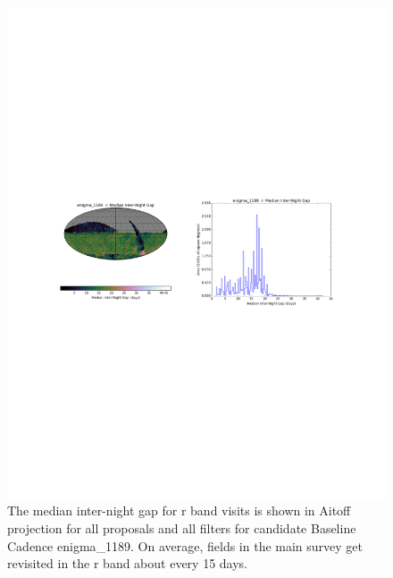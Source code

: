 \documentclass[manuscript]{article}
\begin{document}
\begin{figure}[h!]
\vskip -3.8in
\hskip -0.5in
\includegraphics[angle=0,width=1.19\hsize,clip]{enigma1189_interGap_r.pdf}
\vskip -4.0in
\caption{The median inter-night gap for r band visits is shown in Aitoff projection 
for all proposals and all filters for candidate Baseline Cadence enigma\_1189.
On average, fields in the main survey get revisited in the r band about every 15 days.} 
\label{fig:enigmaGapr}
\end{figure}
\end{document}
